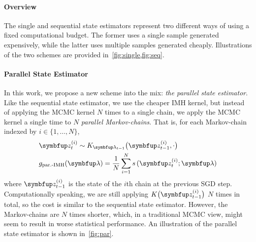 \vspace{-0.08in}
\paragraph{Overview}
The single and sequential state estimators represent two different ways of using a fixed computational budget.
The former uses a single sample generated expensively, while the latter uses multiple samples generated cheaply.
Illustrations of the two schemes are provided in~\cref{fig:single,fig:seq}.

\vspace{-0.08in}
\paragraph{Parallel State Estimator}
In this work, we propose a new scheme into the mix: \textit{the parallel state estimator}.
Like the sequential state estimator, we use the cheaper IMH kernel, but instead of applying the MCMC kernel \(N\) times to a single chain, we apply the MCMC kernel a single time to \(N\) \textit{parallel Markov-chains}.
That is, for each Markov-chain indexed by \(i \in \{1, \ldots, N\}\),
%
\vspace{-0.05in}
\begin{align*}
  &\vz_{t}^{(i)} \sim K_{\vlambda_{t-1}}\big(\vz_{t-1}^{(i)}, \cdot \big) \\
  &g_{\text{par.-IMH}}(\vlambda) = \frac{1}{N} \sum_{i=1}^N s\,(\vz_{t}^{(i)}; \vlambda)
\end{align*}
%
where \(\vz_{t-1}^{(i)}\) is the state of the \(i\)th chain at the previous SGD step.
Computationally speaking, we are still applying \(K\big(\vz_{t-1}^{(i)}\big)\) \(N\) times in total, so the cost is similar to the sequential state estimator.
However, the Markov-chains are \(N\) times shorter, which, in a traditional MCMC view, might seem to result in worse statistical performance.
An illustration of the parallel state estimator is shown in~\cref{fig:par}.

\vspace{-0.05in}
